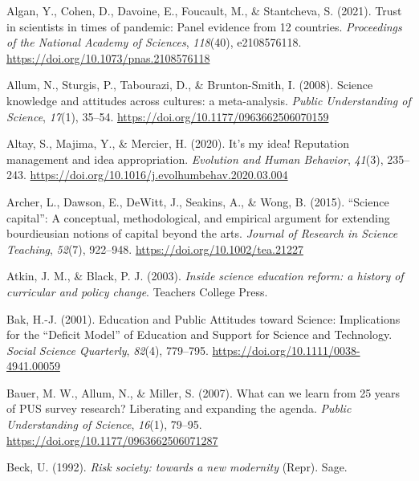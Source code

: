 \documentclass[
  jou,
  floatsintext,
  longtable,
  nolmodern,
  notxfonts,
  notimes,
  colorlinks=true,linkcolor=blue,citecolor=blue,urlcolor=blue]{apa7}
\newlength{\cslhangindent}
\newenvironment{CSLReferences}[2] %
 {\begin{list}{}{%
  \setlength{\itemindent}{0pt}
  \setlength{\leftmargin}{0pt}
  \setlength{\parsep}{0pt}
  \ifodd #1
   \setlength{\leftmargin}{\cslhangindent}
   \setlength{\itemindent}{-1\cslhangindent}
  \fi
  \setlength{\itemsep}{#2\baselineskip}}}
 {\end{list}}
\begin{document}
\label{refs}
\begin{CSLReferences}{1}{0}
Algan, Y., Cohen, D., Davoine, E., Foucault, M., \& Stantcheva, S.
(2021). Trust in scientists in times of pandemic: Panel evidence from 12
countries. \emph{Proceedings of the National Academy of Sciences},
\emph{118}(40), e2108576118.
\url{https://doi.org/10.1073/pnas.2108576118}

Allum, N., Sturgis, P., Tabourazi, D., \& Brunton-Smith, I. (2008).
Science knowledge and attitudes across cultures: a meta-analysis.
\emph{Public Understanding of Science}, \emph{17}(1), 35--54.
\url{https://doi.org/10.1177/0963662506070159}

Altay, S., Majima, Y., \& Mercier, H. (2020). It's my idea! Reputation
management and idea appropriation. \emph{Evolution and Human Behavior},
\emph{41}(3), 235--243.
\url{https://doi.org/10.1016/j.evolhumbehav.2020.03.004}

Archer, L., Dawson, E., DeWitt, J., Seakins, A., \& Wong, B. (2015).
{``}Science capital{''}: A conceptual, methodological, and empirical
argument for extending bourdieusian notions of capital beyond the arts.
\emph{Journal of Research in Science Teaching}, \emph{52}(7), 922--948.
\url{https://doi.org/10.1002/tea.21227}

Atkin, J. M., \& Black, P. J. (2003). \emph{Inside science education
reform: a history of curricular and policy change}. Teachers College
Press.

Bak, H.-J. (2001). Education and Public Attitudes toward Science:
Implications for the {``}Deficit Model{''} of Education and Support for
Science and Technology. \emph{Social Science Quarterly}, \emph{82}(4),
779--795. \url{https://doi.org/10.1111/0038-4941.00059}

Bauer, M. W., Allum, N., \& Miller, S. (2007). What can we learn from 25
years of PUS survey research? Liberating and expanding the agenda.
\emph{Public Understanding of Science}, \emph{16}(1), 79--95.
\url{https://doi.org/10.1177/0963662506071287}

Beck, U. (1992). \emph{Risk society: towards a new modernity} (Repr).
Sage.


\end{CSLReferences}
\end{document}
